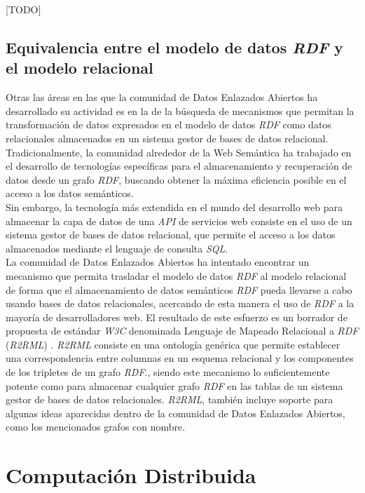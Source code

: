 [TODO]

\subsection{Equivalencia entre el modelo de datos \textit{RDF} y el modelo relacional}

Otras las \'areas en las que la comunidad de Datos Enlazados Abiertos ha desarrollado su actividad es en la de la b\'usqueda de mecanismos que permitan la transformaci\'on de datos expresados en el modelo de datos \textit{RDF} como datos relacionales almacenados en un sistema gestor de bases de datos relacional.\\
Tradicionalmente, la comunidad alrededor de la Web Sem\'antica ha trabajado en el desarrollo de tecnolog\'ias espec\'ificas para el almacenamiento y recuperaci\'on de datos desde un grafo \textit{RDF}, buscando obtener la m\'axima eficiencia posible en el acceso a los datos sem\'anticos.\\
Sin embargo, la tecnolog\'ia m\'as extendida en el mundo del desarrollo web para almacenar la capa de datos de una \textit{API} de servicios web consiste en el uso de un sistema gestor de bases de datos relacional, que permite el acceso a los datos almacenados mediante el lenguaje de consulta \textit{SQL}.\\
La comunidad de Datos Enlazados Abiertos ha intentado encontrar un mecanismo que permita trasladar el modelo de datos \textit{RDF} al modelo relacional de forma que el almacenamiento de datos sem\'anticos \textit{RDF} pueda llevarse a cabo usando bases de datos relacionales, acercando de esta manera el uso de \textit{RDF} a la mayor\'ia de desarrolladores web.
El resultado de este esfuerzo es un borrador de propuesta de est\'andar \textit{W3C} denominada Lenguaje de Mapeado Relacional a \textit{RDF} (\textit{R2RML}) \cite{r2rml}. \textit{R2RML} consiste en una ontolog\'ia gen\'erica que permite establecer una correspondencia entre columnas en un esquema relacional y los componentes de los tripletes de un grafo \textit{RDF}., siendo este mecanismo lo suficientemente potente como para almacenar cualquier grafo \textit{RDF} en las tablas de un sistema gestor de bases de datos relacionales. \textit{R2RML}, tambi\'en incluye soporte para algunas ideas aparecidas dentro de la comunidad de Datos Enlazados Abiertos, como los mencionados grafos con nombre.


\section{Computaci\'on Distribuida}

